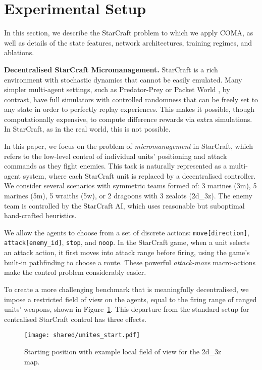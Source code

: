 \documentclass[letterpaper]{article}
\newcommand{\citep}{\cite}
\begin{document}
\section{Experimental Setup}
\label{sec:setting}

In this section, we describe the StarCraft problem to which we apply COMA, as
well as details of the state features, network architectures, training regimes,
and ablations.

\textbf{Decentralised StarCraft Micromanagement.} StarCraft is a rich
environment with stochastic dynamics that cannot be easily emulated. Many
simpler multi-agent settings, such as Predator-Prey \citep{tan1993multi} or
Packet World \citep{weyns2005packet}, by contrast, have full simulators with
controlled randomness that can be freely set to any state in order to perfectly
replay experiences. This makes it possible, though computationally expensive, to
compute difference rewards via extra simulations. In StarCraft, as in the real
world, this is not possible.

In this paper, we focus on the problem of \emph{micromanagement} in StarCraft,
which refers to the low-level control of individual units' positioning and
attack commands as they fight enemies. This task is naturally represented as a
multi-agent system, where each StarCraft unit is replaced by a decentralised
controller. We consider several scenarios with symmetric teams formed of: 3
marines (3m), 5 marines (5m), 5 wraiths (5w), or 2 dragoons with 3 zealots 
(2d\_3z). The enemy team is controlled by the StarCraft AI, which uses 
reasonable but suboptimal hand-crafted heuristics.

We allow the agents to choose from a set of discrete actions:
\texttt{move[direction]}, \texttt{attack[enemy\_id]}, \texttt{stop}, and
\texttt{noop}. In the StarCraft game, when a unit selects an attack action, it
first moves into attack range before firing, using the game's built-in
pathfinding to choose a route. These powerful \emph{attack-move} macro-actions
make the control problem considerably easier.


To create a more challenging benchmark that is meaningfully decentralised, we
impose a restricted field of view on the agents, equal to the firing range of
ranged units' weapons, shown in Figure~\ref{fig:setup}. This departure from the standard setup for
centralised StarCraft control has three effects.

\begin{figure}[h!]
    \begin{center}
        \texttt{[image: shared/unites\_start.pdf]}
    \end{center}
    \caption{Starting position with example local field of view for the 2d\_3z map.}
    \label{fig:setup}
\end{figure}
\end{document}
